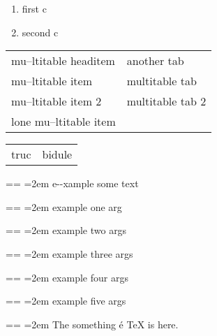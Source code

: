 \documentclass{book}
\makeatletter
\newenvironment{GNUTexinfopreformatted}{%
  \par\obeylines\obeyspaces\frenchspacing
  \parskip=\z@\parindent=\z@}{}
\makeatother
\begin{document}
\begin{enumerate}[label=\alph*.,start=3]
\item first c
\item second c
\end{enumerate}

\begin{tabular}{m{} m{}}%
mu--ltitable headitem &another tab\\
mu--ltitable item &multitable tab\\
mu--ltitable item 2 &multitable tab 2
\index[cp]{index entry within multitable}%
\\
lone mu--ltitable item&\\
\end{tabular}%

\begin{tabular}{m{} m{}}%
truc &bidule\\
\end{tabular}%

\begin{GNUTexinfopreformatted}
\leftskip=2em\relax\ttfamily%
e{-}{-}xample  some
   text
\end{GNUTexinfopreformatted}

\begin{GNUTexinfopreformatted}
\leftskip=2em\relax\ttfamily%
example one arg
\end{GNUTexinfopreformatted}

\begin{GNUTexinfopreformatted}
\leftskip=2em\relax\ttfamily%
example two args
\end{GNUTexinfopreformatted}

\begin{GNUTexinfopreformatted}
\leftskip=2em\relax\ttfamily%
example three args
\end{GNUTexinfopreformatted}

\begin{GNUTexinfopreformatted}
\leftskip=2em\relax\ttfamily%
example four args
\end{GNUTexinfopreformatted}

\begin{GNUTexinfopreformatted}
\leftskip=2em\relax\ttfamily%
example five args
\end{GNUTexinfopreformatted}

\begin{GNUTexinfopreformatted}
\leftskip=2em\relax\ttfamily%
The something \'{e} \TeX{} is here.
\end{GNUTexinfopreformatted}
\end{document}
